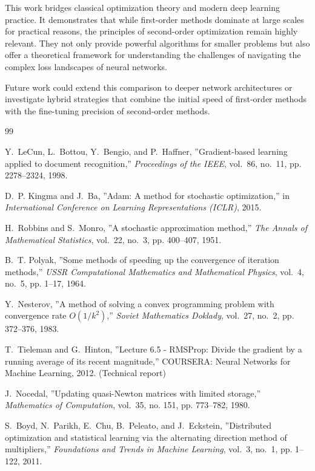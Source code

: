 \documentclass[20pt]{article}
\begin{document}
This work bridges classical optimization theory and modern deep learning practice. It demonstrates that while first-order methods dominate at large scales for practical reasons, the principles of second-order optimization remain highly relevant. They not only provide powerful algorithms for smaller problems but also offer a theoretical framework for understanding the challenges of navigating the complex loss landscapes of neural networks.

Future work could extend this comparison to deeper network architectures or investigate hybrid strategies that combine the initial speed of first-order methods with the fine-tuning precision of second-order methods.

\clearpage
\begin{thebibliography}{99}

Y.~LeCun, L.~Bottou, Y.~Bengio, and P.~Haffner,
''Gradient-based learning applied to document recognition,''
\emph{Proceedings of the IEEE}, vol.~86, no.~11, pp. 2278--2324, 1998.

D.~P. Kingma and J.~Ba,
''Adam: A method for stochastic optimization,''
in \emph{International Conference on Learning Representations (ICLR)}, 2015.

H.~Robbins and S.~Monro,
''A stochastic approximation method,''
\emph{The Annals of Mathematical Statistics}, vol.~22, no.~3, pp. 400--407, 1951.

B.~T. Polyak,
''Some methods of speeding up the convergence of iteration methods,''
\emph{USSR Computational Mathematics and Mathematical Physics}, vol.~4, no.~5, pp. 1--17, 1964.

Y.~Nesterov,
''A method of solving a convex programming problem with convergence rate $O(1/k^2)$,''
\emph{Soviet Mathematics Doklady}, vol.~27, no.~2, pp. 372--376, 1983.

T.~Tieleman and G.~Hinton,
''Lecture 6.5 - RMSProp: Divide the gradient by a running average of its recent magnitude,''
COURSERA: Neural Networks for Machine Learning, 2012. (Technical report)

J.~Nocedal,
''Updating quasi-Newton matrices with limited storage,''
\emph{Mathematics of Computation}, vol.~35, no. 151, pp. 773--782, 1980.

S.~Boyd, N.~Parikh, E.~Chu, B.~Peleato, and J.~Eckstein,
''Distributed optimization and statistical learning via the alternating direction method of multipliers,''
\emph{Foundations and Trends in Machine Learning}, vol.~3, no.~1, pp. 1--122, 2011.


\end{thebibliography}
\end{document}
